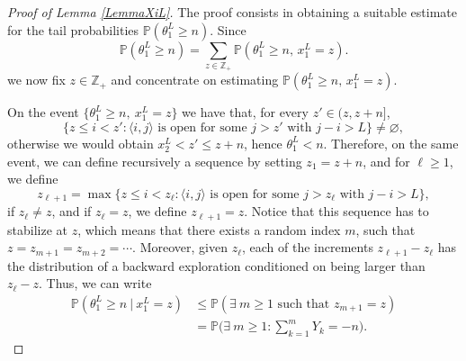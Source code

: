 \documentclass[a4paper,oneside,12pt]{amsart}
\renewcommand{\leq}{\leqslant}
\renewcommand{\geq}{\geqslant}
\theoremstyle{plain}
\theoremstyle{definition}
\theoremstyle{remark}
\renewcommand{\P}{\mathbb{P}}
\begin{document}
\begin{proof}[Proof of Lemma \ref{LemmaXiL}]
The proof consists in obtaining a suitable estimate for the tail probabilities $\P( \theta^{L}_1 \geq n)$.
Since
\begin{equation}
\P( \theta^{L}_1 \geq n) = \sum_{z \in \mathbb{Z}_{+}} \P( \theta^{L}_1 \geq n, \, x_1^{L}=z).
\end{equation}
we now fix $z \in \mathbb{Z}_{+}$ and concentrate on estimating $\P( \theta^{L}_1 \geq n,\, x_1^{L}=z)$.

On the event $\{\theta_1^L \geq n,~ x^L_1 = z\}$ we have that, for every $z' \in (z, z+n]$, 
\begin{equation*}
\big\{ z \leq i < z' \colon \text{$\langle i,j\rangle$ is open for some $j > z'$ with $j-i > L$} \big\} \neq \varnothing,
\end{equation*}
otherwise we would obtain $x_{2}^L < z' \leq z+n$, hence $\theta_1^L < n$.
Therefore, on the same event, we can define recursively a  sequence by setting $z_1 = z+n$, and for $\ell \geq 1$, we define
\begin{equation*}
z_{\ell + 1} = \max\big\{ z \leq i < z_{\ell} \colon \textrm{$\langle i,j\rangle$ is open for some $j > z_{\ell}$ with  $j-i > L$} \big\},
\end{equation*}
if $z_{\ell} \neq z$, and if $z_{\ell} =z$, we define $z_{\ell +1} = z$.
Notice that this sequence has to stabilize at $z$, which means that there exists a random index $m$, such that $z= z_{m+1} = z_{m+2} = \cdots$.
Moreover, given $z_\ell$, each of the increments $z_{\ell+1} - z_{\ell}$ has the distribution of a  backward exploration conditioned on being larger than $z_{\ell} - z$.
Thus, we can write
\begin{equation*}
\begin{split}
 \P\left(\theta_1^L \geq n ~\vert~ x_1^L = z \right) & \leq \P\left(\exists~ m \geq 1 \textrm{ such that } z_{m+1} = z\right) \\
  & = \P\Big(\exists~ m \geq 1 \colon \sum_{k=1}^m Y_k = -n \Big).
\end{split}
\end{equation*}


\end{proof}
\end{document}
